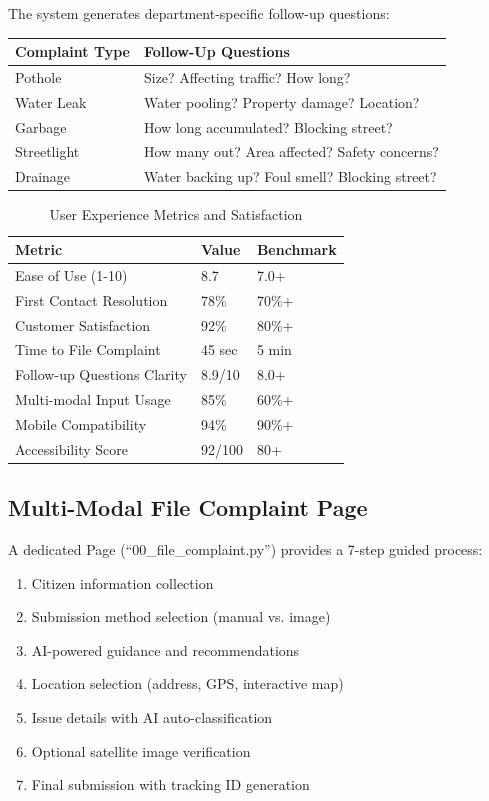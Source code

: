 \documentclass[11pt,a4paper]{article}
\begin{document}
The system generates department-specific follow-up questions:

\begin{table}[H]
\centering
\begin{tabular}{|l|p{4cm}|}
\hline
\textbf{Complaint Type} & \textbf{Follow-Up Questions} \\
\hline
Pothole & Size? Affecting traffic? How long? \\
Water Leak & Water pooling? Property damage? Location? \\
Garbage & How long accumulated? Blocking street? \\
Streetlight & How many out? Area affected? Safety concerns? \\
Drainage & Water backing up? Foul smell? Blocking street? \\
\hline
\end{tabular}
\end{table}

\begin{table}[H]
\centering
\caption{User Experience Metrics and Satisfaction}
\label{tab:user_experience}
\begin{tabular}{|l|l|l|}
\hline
\textbf{Metric} & \textbf{Value} & \textbf{Benchmark} \\
\hline
Ease of Use (1-10) & 8.7 & 7.0+ \\
First Contact Resolution & 78\% & 70\%+ \\
Customer Satisfaction & 92\% & 80\%+ \\
Time to File Complaint & 45 sec & 5 min \\
Follow-up Questions Clarity & 8.9/10 & 8.0+ \\
Multi-modal Input Usage & 85\% & 60\%+ \\
Mobile Compatibility & 94\% & 90\%+ \\
Accessibility Score & 92/100 & 80+ \\
\hline
\end{tabular}
\end{table}

\subsection{Multi-Modal File Complaint Page}

A dedicated Page (``00\_file\_complaint.py'') provides a 7-step guided process:
\begin{enumerate}
    \item Citizen information collection
    \item Submission method selection (manual vs. image)
    \item AI-powered guidance and recommendations
    \item Location selection (address, GPS, interactive map)
    \item Issue details with AI auto-classification
    \item Optional satellite image verification
    \item Final submission with tracking ID generation
\end{enumerate}
\end{document}
